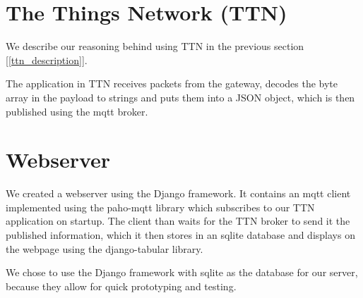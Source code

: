 \section{The Things Network (TTN)}
	We describe our reasoning behind using TTN in the previous section [\ref{ttn_description}].

	The application in TTN receives packets from the gateway, decodes the byte array in the payload to strings and puts them into a JSON object, which is then published using the mqtt broker.

\section{Webserver}
	We created a webserver using the Django framework. It contains an mqtt client implemented using the paho-mqtt library which subscribes to our TTN application on startup. The client than waits for the TTN broker to send it the published information, which it then stores in an sqlite database and displays on the webpage using the django-tabular library.

	We chose to use the Django framework with sqlite as the database for our server, because they allow for quick prototyping and testing.

